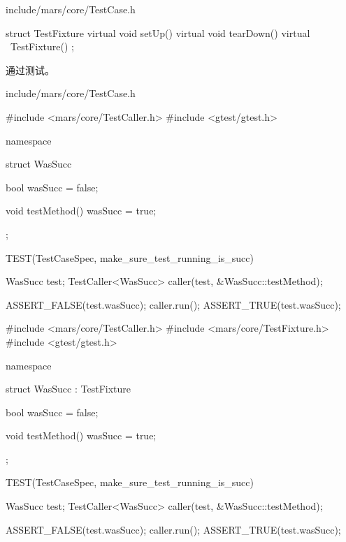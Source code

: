 \begin{nodiff}{include/mars/core/TestCase.h}
\begin{c++}
struct TestFixture {
  virtual void setUp() {}
  virtual void tearDown() {}
  virtual ~TestFixture() {}
};
\end{c++}
\end{nodiff}

通过测试。

\begin{diff}{include/mars/core/TestCase.h}
\begin{minicpp}
#include <mars/core/TestCaller.h>
#include <gtest/gtest.h>

namespace {
  struct WasSucc {
    bool wasSucc = false;

    void testMethod() {
      wasSucc = true;
    }
  };
}

TEST(TestCaseSpec, make_sure_test_running_is_succ) {
  WasSucc test;
  TestCaller<WasSucc> caller(test, &WasSucc::testMethod);

  ASSERT_FALSE(test.wasSucc);
  caller.run();
  ASSERT_TRUE(test.wasSucc);
}
\end{minicpp}
\tcblower
\begin{minicpp}
#include <mars/core/TestCaller.h>
#include <mars/core/TestFixture.h>
#include <gtest/gtest.h>

namespace {
  struct WasSucc : TestFixture {
    bool wasSucc = false;

    void testMethod() {
      wasSucc = true;
    }
  };
}

TEST(TestCaseSpec, make_sure_test_running_is_succ) {
  WasSucc test;
  TestCaller<WasSucc> caller(test, &WasSucc::testMethod);

  ASSERT_FALSE(test.wasSucc);
  caller.run();
  ASSERT_TRUE(test.wasSucc);
}
\end{minicpp}
\end{diff}

